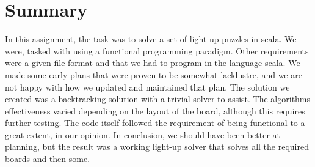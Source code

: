 \documentclass[12pt]{article}
\begin{document}
\section{Summary}
In this assignment, the task was to solve a set of light-up puzzles in scala. We were, tasked with using a functional programming paradigm. Other requirements were a given file format and that we had to program in the language scala. We made some early plans that were proven to be somewhat lacklustre, and we are not happy with how we updated and maintained that plan. The solution we created was a backtracking solution with a trivial solver to assist. The algorithms effectiveness varied depending on the layout of the board, although this requires further testing. The code itself followed the requirement of being functional to a great extent, in our opinion. In conclusion, we should have been better at planning, but the result was a working light-up solver that solves all the required boards and then some.
\end{document}
